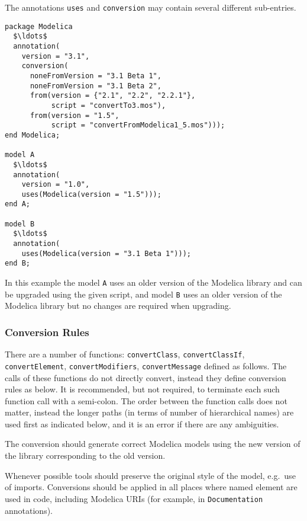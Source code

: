 The annotations \lstinline!uses! and \lstinline!conversion! may contain several different sub-entries.

\begin{example}
\begin{lstlisting}[language=modelica]
package Modelica
  $\ldots$
  annotation(
    version = "3.1",
    conversion(
      noneFromVersion = "3.1 Beta 1",
      noneFromVersion = "3.1 Beta 2",
      from(version = {"2.1", "2.2", "2.2.1"},
           script = "convertTo3.mos"),
      from(version = "1.5",
           script = "convertFromModelica1_5.mos")));
end Modelica;

model A
  $\ldots$
  annotation(
    version = "1.0",
    uses(Modelica(version = "1.5")));
end A;

model B
  $\ldots$
  annotation(
    uses(Modelica(version = "3.1 Beta 1")));
end B;
\end{lstlisting}
In this example the model \lstinline!A! uses an older version of the Modelica library and can be upgraded using the given script, and model \lstinline!B! uses an older version of the Modelica library but no changes are required when upgrading.
\end{example}

\subsubsection{Conversion Rules}\label{conversion-rules}

There are a number of functions: \lstinline!convertClass!, \lstinline!convertClassIf!,
\lstinline!convertElement!, \mbox{\lstinline!convertModifiers!,} \lstinline!convertMessage! defined as follows. The
calls of these functions do not directly convert, instead they define
conversion rules as below.
It is recommended, but not required, to terminate each such function call with a semi-colon.
The order between the function calls does not matter, instead the longer paths (in terms of number of hierarchical names)
are used first as indicated below, and it is an error if there are any
ambiguities.

The conversion should generate correct Modelica models using the new version of the library
corresponding to the old version.

\begin{nonnormative}
Whenever possible tools should preserve the original style of the model, e.g.\ use of imports.
Conversions should be applied in all places where named element are used in code, including Modelica URIs (for example, in \lstinline!Documentation! annotations).
\end{nonnormative}

